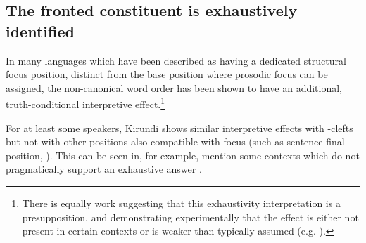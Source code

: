\documentclass[12pt]{article}
\begin{document}
\subsection{The fronted constituent is exhaustively identified} \label{sec:exh}

In many languages which have been described as having a dedicated structural focus position, distinct from the base position where prosodic focus can be assigned, the non-canonical word order has been shown to have an additional, truth-conditional interpretive effect.\footnote{There is equally work suggesting that this exhaustivity interpretation is a presupposition, and demonstrating experimentally that the effect is either not present in certain contexts or is weaker than typically assumed (e.g. \citealt{buring-kriz-2013}).}

For at least some speakers, Kirundi shows similar interpretive effects with -clefts but not with other positions also compatible with focus (such as sentence-final position, \citealt{ndayiragije-1999}). This can be seen in, for example, mention-some contexts which do not pragmatically support an exhaustive answer \citep{cable-foc}.



\bex
{}
\bxl
	 \label{ex:exh-cleft}
\fxl
\fex
\end{document}
